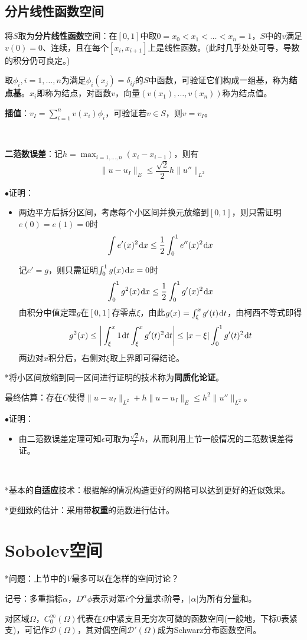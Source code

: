 \documentclass[a4paper,UTF8,fontset=windows]{ctexart}
\newcommand*{\dr}{\hspace{0.07em}\mathrm{d}}
\newcommand*{\cd}{\mathcal{D}}
\newcommand{\proo}[1]{{\kaishu $\bullet$证明：
\begin{itemize}
    \item[] #1
\end{itemize}
}}
\begin{document}
\subsection{分片线性函数空间}
将$S$取为\textbf{分片线性函数}空间：在$[0,1]$中取$0=x_0<x_1<\dots<x_n=1$，$S$中的$v$满足$v(0)=0$、连续，且在每个$[x_i,x_{i+1}]$上是线性函数。(此时几乎处处可导，导数的积分仍可良定。)

取$\phi_i,i=1,\dots,n$为满足$\phi_i(x_j)=\delta_{ij}$的$S$中函数，可验证它们构成一组基，称为\textbf{结点基}。$x_i$即称为结点，对函数$v$，向量$(v(x_1),\dots,v(x_n))$称为结点值。

\textbf{插值}：$v_I=\sum_{i=1}^nv(x_i)\phi_i$，可验证若$v\in S$，则$v=v_I$。

\

\textbf{二范数误差}：记$h=\max_{i=1,\dots,n}(x_i-x_{i-1})$，则有
$$\|u-u_I\|_E\le\frac{\sqrt2}{2}h\|u''\|_{L^2}$$

\proo{
    两边平方后拆分区间，考虑每个小区间并换元放缩到$[0,1]$，则只需证明$e(0)=e(1)=0$时
    $$\int e'(x)^2\dr x\le \frac{1}{2}\int_0^1e''(x)^2\dr x$$
    
    记$e'=g$，则只需证明$\int_0^1g(x)\dr x=0$时
    $$\int_0^1g^2(x)\dr x\le\frac{1}{2}\int_0^1g'(x)^2\dr x$$
    由积分中值定理$g$在$[0,1]$存零点$\xi$，由此$g(x)=\int_\xi^xg'(t)\dr t$，由柯西不等式即得
    $$g^2(x)\le\bigg|\int_\xi^x1\dr t\int_\xi^xg'(t)^2\dr t\bigg|\le|x-\xi|\int_0^1g'(t)^2\dr t$$
    两边对$x$积分后，右侧对$\xi$取上界即可得结论。
}

*将小区间放缩到同一区间进行证明的技术称为\textbf{同质化论证}。

最终估算：存在$C$使得$\|u-u_I\|_{L^2}+h\|u-u_I\|_E\le h^2\|u''\|_{L^2}$。

\proo{
    由二范数误差定理可知$\epsilon$可取为$\frac{\sqrt2}{2}h$，从而利用上节一般情况的二范数误差得证。
}

\

*基本的\textbf{自适应}技术：根据解的情况构造更好的网格可以达到更好的近似效果。

*更细致的估计：采用带\textbf{权重}的范数进行估计。

\section{Sobolev空间}
*问题：上节中的$V$最多可以在怎样的空间讨论？

记号：多重指标$\alpha$，$D^\alpha\phi$表示对第$i$个分量求$i$阶导，$|\alpha|$为所有分量和。

对区域$\Omega$，$C_0^\infty(\Omega)$代表在$\Omega$中紧支且无穷次可微的函数空间(一般地，下标0表紧支)，可记作$\cd(\Omega)$，其对偶空间$\cd'(\Omega)$成为Schwarz分布函数空间。
\end{document}
